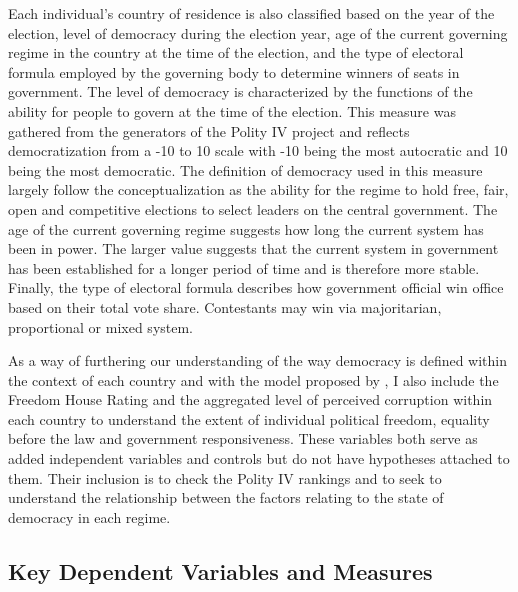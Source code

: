 \documentclass[12pt, titlepage]{article}
\begin{document}
Each individual's country of residence is also classified based on the year of the election, level of democracy during the election year,  age of the current governing regime in the country at the time of the election, and the type of electoral formula employed by the governing body to determine winners of seats in government. The level of democracy is characterized by the functions of the ability for people to govern at the time of the election. This measure was gathered from the generators of the Polity IV project and reflects democratization from a -10 to 10 scale with -10 being the most autocratic and 10 being the most democratic. The definition of democracy used in this measure largely follow the \cite{linz1996problems} conceptualization as the ability for the regime to hold free, fair, open and competitive elections to select leaders on the central government. The age of the current governing regime suggests how long the current system has been in power. The larger value suggests that the current system in government has been established for a longer period of time and is therefore more stable. Finally, the type of electoral formula describes how government official win office based on their total vote share. Contestants may win via majoritarian, proportional or mixed system. 

As a way of furthering our understanding of the way democracy is defined within the context of each country and with the model proposed by \cite{diamond2004overview}, I also include the Freedom House Rating and the aggregated level of perceived corruption within each country to understand the extent of individual political freedom, equality before the law and government responsiveness. These variables both serve as added independent variables and controls but do not have hypotheses attached to them. Their inclusion is to check the Polity IV rankings and to seek to understand the relationship between the factors relating to the state of democracy in each regime.


\subsection{Key Dependent Variables and Measures}
\end{document}
